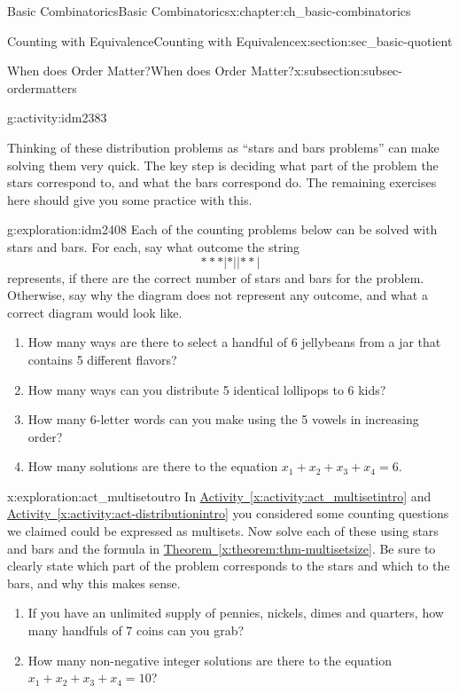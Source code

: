 \documentclass[oneside,10pt,]{book}
\numberwithin{equation}{chapter}
\begin{document}
\begin{chapterptx}{Basic Combinatorics}{}{Basic Combinatorics}{}{}{x:chapter:ch_basic-combinatorics}
\begin{sectionptx}{Counting with Equivalence}{}{Counting with Equivalence}{}{}{x:section:sec_basic-quotient}
\begin{subsectionptx}{When does Order Matter?}{}{When does Order Matter?}{}{}{x:subsection:subsec-ordermatters}
\begin{activity}{}{g:activity:idm2383}
\begin{enumerate}[font=\bfseries,label=(\alph*),ref=\alph*]
\end{enumerate}
\end{activity}
Thinking of these distribution problems as ``stars and bars problems'' can make solving them very quick.  The key step is deciding what part of the problem the stars correspond to, and what the bars correspond do.  The remaining exercises here should give you some practice with this.%
\begin{exploration}{}{g:exploration:idm2408}%
Each of the counting problems below can be solved with stars and bars. For each, say what outcome the string%
\begin{equation*}
***|*||**|
\end{equation*}
represents, if there are the correct number of stars and bars for the problem. Otherwise, say why the diagram does not represent any outcome, and what a correct diagram would look like.%
\begin{enumerate}
\item{}How many ways are there to select a handful of 6 jellybeans from a jar that contains 5 different flavors?%
\item{}How many ways can you distribute 5 identical lollipops to 6 kids?%
\item{}How many 6-letter words can you make using the 5 vowels in increasing order?%
\item{}How many solutions are there to the equation \(x_1 + x_2 + x_3 + x_4 = 6\).%
\end{enumerate}
%
\end{exploration}
\begin{exploration}{}{x:exploration:act_multisetoutro}%
In \hyperref[x:activity:act_multisetintro]{Activity~\ref{x:activity:act_multisetintro}} and \hyperref[x:activity:act-distributionintro]{Activity~\ref{x:activity:act-distributionintro}} you considered some counting questions we claimed could be expressed as multisets.  Now solve each of these using stars and bars and the formula in \hyperref[x:theorem:thm-multisetsize]{Theorem~\ref{x:theorem:thm-multisetsize}}.  Be sure to clearly state which part of the problem corresponds to the stars and which to the bars, and why this makes sense.%
\begin{enumerate}[font=\bfseries,label=(\alph*),ref=\alph*]
\item{}If you have an unlimited supply of pennies, nickels, dimes and quarters, how many handfuls of 7 coins can you grab?%
\item{}How many non-negative integer solutions are there to the equation \(x_1 + x_2 + x_3 + x_4 = 10\)?%

\end{enumerate}
\end{exploration}
\end{subsectionptx}
\end{sectionptx}
\end{chapterptx}
\end{document}
